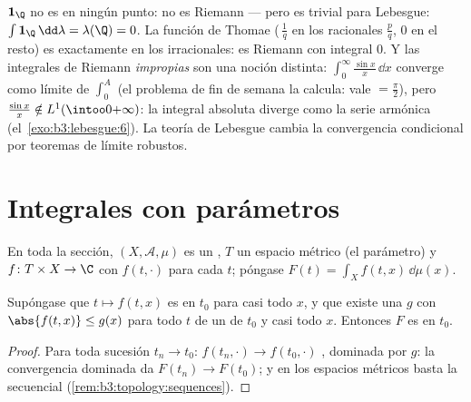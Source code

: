 \begin{example}\label{ex:b3:lebesgue:riemannexamples}
$\mathbf 1_\Q$ no es  en
ningún punto: no es  Riemann ---
pero es trivial para Lebesgue: $\int\mathbf 1_\Q\,\dd\lambda =
\lambda(\Q) = 0$. La función de Thomae (\,$\frac1q$ en los racionales
$\frac pq$, $0$ en el resto) es
 exactamente en los
irracionales: es  Riemann con
integral $0$. Y las integrales de Riemann \emph{impropias} son una
noción distinta: $\int_0^\infty\frac{\sin x}x\,\dd x$ converge como
límite de $\int_0^A$ (el problema de fin de semana la calcula: vale
$= \frac\pi2$), pero $\frac{\sin x}x \notin L^1(\intoo0{+\infty})$: la
integral absoluta diverge como la serie armónica
(el~\cref{exo:b3:lebesgue:6}). La teoría de Lebesgue cambia la
convergencia condicional por teoremas de límite robustos.
\end{example}

\section{Integrales con parámetros}

En toda la sección, $(X, \mathcal A, \mu)$ es un
, $T$ un espacio
métrico (el parámetro) y $f \colon T \times X \to \C$ con $f(t, \cdot)$
 para cada $t$; póngase
$F(t) = \int_X
f(t, x)\,\dd\mu(x)$.

\begin{theorem}[Continuidad]\label{thm:b3:lebesgue:paramcont}
Supóngase que $t \mapsto f(t,x)$ es
 en $t_0$ para casi todo
$x$, y que existe una $g$  con
$\abs{f(t,x)} \leq
g(x)$ para todo $t$ de un  de
$t_0$ y casi todo $x$. Entonces $F$ es
 en $t_0$.
\end{theorem}

\begin{proof}
Para toda sucesión $t_n \to t_0$: $f(t_n, \cdot) \to f(t_0,
\cdot)$ , dominada por $g$: la convergencia dominada
da $F(t_n) \to F(t_0)$; y en los espacios métricos basta la
 secuencial
(\cref{rem:b3:topology:sequences}).
\end{proof}

